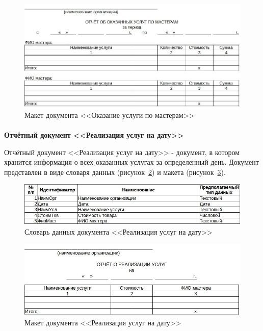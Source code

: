 \documentclass[12pt, a4paper, simple]{eskdtext}
\begin{document}
    \begin{figure}[!h]
        \centering
        \includegraphics[width=14cm]
            {_docs/ОТ_ОказУслПоМастеру_макет.jpg}
        \caption{Макет документа <<Оказание услуги по мастерам>>}
        \label{fig:OT_OkazYslPoMastery_maket}
    \end{figure}

    \newpage
    \paragraph{} \textbf{Отчётный документ <<Реализация услуг на дату>>}

    Отчётный документ <<Реализация услуг на дату>>
    - документ, в котором хранится информация о всех оказанных услугах за определенный день.
    Документ представлен в виде словаря данных (рисунок~\ref{fig:OT_RealizYslNaDaty_tipi})
    и макета (рисунок~\ref{fig:OT_RealizYslNaDaty_maket}).

    \begin{figure}[!h]
        \centering
        \includegraphics[width=14cm]
            {_docs/ОТ_РеализУслНаДату_типы.jpg}
        \caption{Словарь данных документа <<Реализация услуг на дату>>}
        \label{fig:OT_RealizYslNaDaty_tipi}
    \end{figure}

    \begin{figure}[!h]
        \centering
        \includegraphics[width=14cm]
            {_docs/ОТ_РеализУслНаДату_макет.jpg}
        \caption{Макет документа <<Реализация услуг на дату>>}
        \label{fig:OT_RealizYslNaDaty_maket}
    \end{figure}
\end{document}
